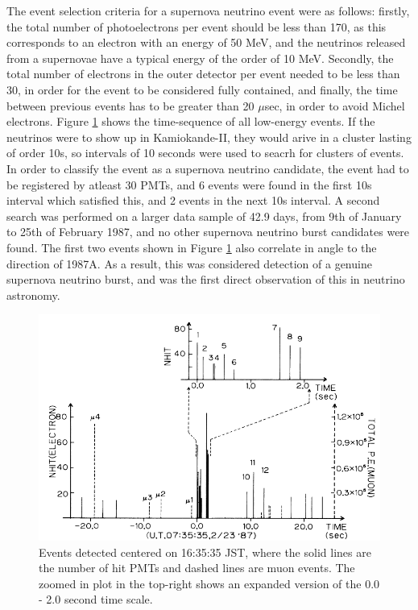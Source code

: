 The event selection criteria for a supernova neutrino event were as follows: firstly, the total number of photoelectrons per event should be less than 170, as this corresponds to an electron with an energy of 50 MeV, and the neutrinos released from a supernovae have a typical energy of the order of 10 MeV. Secondly, the total number of electrons in the outer detector per event needed to be less than 30, in order for the event to be considered fully contained, and finally, the time between previous events has to be greater than 20 $\mu$sec, in order to avoid Michel electrons. Figure \ref{fig:1987A_events} shows the time-sequence of all low-energy events. If the neutrinos were to show up in Kamiokande-II, they would arive in a cluster lasting of order 10s, so intervals of 10 seconds were used to seacrh for clusters of events. In order to classify the event as a supernova neutrino candidate, the event had to be registered by atleast 30 PMTs, and 6 events were found in the first 10s interval which satisfied this, and 2 events in the next 10s interval. A second search was performed on a larger data sample of 42.9 days, from 9th of January to 25th of February 1987, and no other supernova neutrino burst candidates were found. The first two events shown in Figure \ref{fig:1987A_events} also correlate in angle to the direction of 1987A. As a result, this was considered detection of a genuine supernova neutrino burst, and was the first direct observation of this in neutrino astronomy. 

\begin{figure}
    \includegraphics[width=\textwidth]{Figures/1987A_events.png}
    \caption{Events detected centered on 16:35:35 JST,  where the solid lines are the number of hit PMTs and dashed lines are muon events. The zoomed in plot in the top-right shows an expanded version of the 0.0 - 2.0 second time scale.  }
    \label{fig:1987A_events}
\end{figure}

